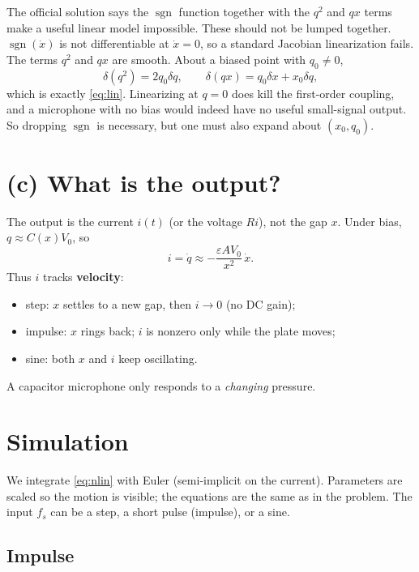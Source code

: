 \documentclass[11pt,a4paper]{article}
\begin{document}
The official solution says the \(\operatorname{sgn}\) function together with the \(q^2\) and \(qx\) terms
make a useful linear model impossible. These should not be lumped together.
\(\operatorname{sgn}(\dot{x})\) is not differentiable at \(\dot{x}=0\), so a standard Jacobian linearization fails.
The terms \(q^2\) and \(qx\) are smooth. About a biased point with \(q_0\neq 0\),
\[
\delta(q^2)=2q_0\delta q,\qquad
\delta(qx)=q_0\delta x+x_0\delta q,
\]
which is exactly \eqref{eq:lin}. Linearizing at \(q=0\) does kill the first-order coupling, and a microphone
with no bias would indeed have no useful small-signal output.
So dropping \(\operatorname{sgn}\) is necessary, but one must also expand about \((x_0,q_0)\).

\section{(c) What is the output?}

The output is the current \(i(t)\) (or the voltage \(Ri\)), not the gap \(x\).
Under bias, \(q\approx C(x)V_0\), so
\begin{equation}
  i=\dot{q}\approx -\frac{\varepsilon A V_0}{x^2}\,\dot{x}.
\label{eq:i}
\end{equation}
Thus \(i\) tracks \textbf{velocity}:
\begin{itemize}
  \item step: \(x\) settles to a new gap, then \(i\to 0\) (no DC gain);
  \item impulse: \(x\) rings back; \(i\) is nonzero only while the plate moves;
  \item sine: both \(x\) and \(i\) keep oscillating.
\end{itemize}
A capacitor microphone only responds to a \emph{changing} pressure.

\section{Simulation}

We integrate \eqref{eq:nlin} with Euler (semi-implicit on the current).
Parameters are scaled so the motion is visible; the equations are the same as in the problem.
The input \(f_s\) can be a step, a short pulse (impulse), or a sine.

\subsection{Impulse}
\end{document}
